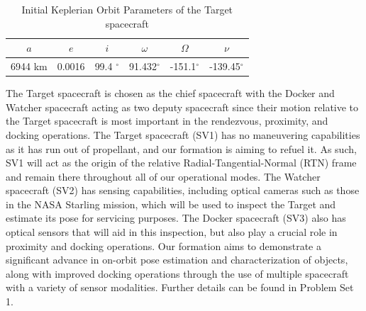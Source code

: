 \begin{table}[h]
\centering
\begin{tabular}{cccccc} \hline
    $a$ & $e$ & $i$ & $\omega$ & $\Omega$ & $\nu$ \\ \hline 
     6944 km & 0.0016 & 99.4 $^\circ$ & 91.432$^\circ$ & -151.1$^\circ$ & -139.45$^\circ$ \\ \hline
\end{tabular}
\caption{Initial Keplerian Orbit Parameters of the Target spacecraft}
\label{tab:abs_oe_kepler_summary}
\end{table}

The Target spacecraft is chosen as the chief spacecraft with the Docker and Watcher spacecraft acting as two deputy spacecraft since their motion relative to the Target spacecraft is most important in the rendezvous, proximity, and docking operations. The Target spacecraft (SV1) has no maneuvering capabilities as it has run out of propellant, and our formation is aiming to refuel it. As such, SV1 will act as the origin of the relative Radial-Tangential-Normal (RTN) frame and remain there throughout all of our operational modes. The Watcher spacecraft (SV2) has sensing capabilities, including optical cameras such as those in the NASA Starling mission, which will be used to inspect the Target and estimate its pose for servicing purposes. The Docker spacecraft (SV3) also has optical sensors that will aid in this inspection, but also play a crucial role in proximity and docking operations. Our formation aims to demonstrate a significant advance in on-orbit pose estimation and characterization of objects, along with improved docking operations through the use of multiple spacecraft with a variety of sensor modalities. Further details can be found in Problem Set 1. 

